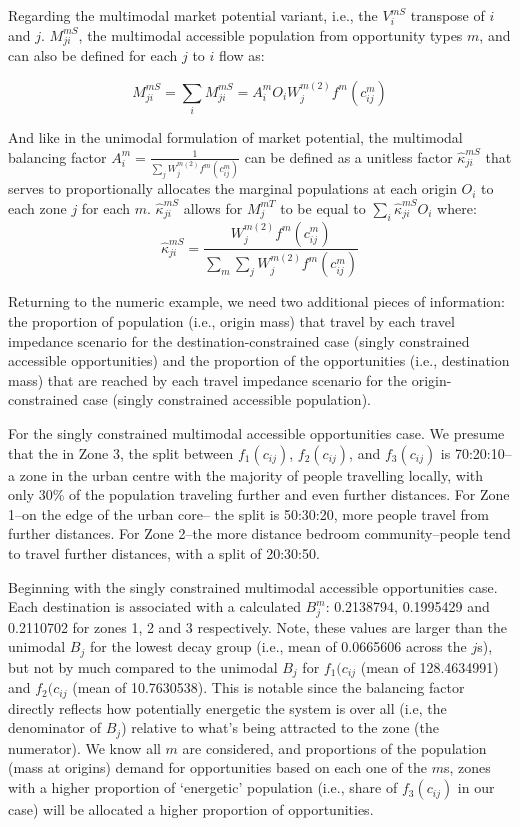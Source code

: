 \documentclass[
11pt, %
oneside, %
english, %
singlespacing, %
]{macthesis} %
\begin{document}
Regarding the multimodal market potential variant, i.e., the \(V_i^{mS}\) transpose of \(i\) and \(j\). \(M^{mS}_{ji}\), the multimodal accessible population from opportunity types \(m\), and can also be defined for each \(j\) to \(i\) flow as:

\begin{equation}
\label{eq:singly-constrained-multimodal-market}
M^{mS}_{ji} = \sum_i M^{mS}_{ji} = A_i^{m} O_i W_j^{m(2)} f^m(c^m_{ij})
\end{equation} 

And like in the unimodal formulation of market potential, the multimodal balancing factor \(A_i^{m} = \frac{1}{\sum_j W_j^{m(2)} f^m(c^m_{ij})}\) can be defined as a unitless factor \(\hat \kappa^{mS}_{ji}\) that serves to proportionally allocates the marginal populations at each origin \(O_i\) to each zone \(j\) for each \(m\). \(\hat \kappa^{mS}_{ji}\) allows for \(M^{mT}_j\) to be equal to \(\sum_i \hat \kappa_{ji}^{mS} O_i\) where:
\[
\hat \kappa_{ji}^{mS} = \frac{W_j^{m(2)} f^m(c^m_{ij})}{\sum_m\sum_j W_j^{m(2)} f^m(c^m_{ij})}
\]

Returning to the numeric example, we need two additional pieces of information: the proportion of population (i.e., origin mass) that travel by each travel impedance scenario for the destination-constrained case (singly constrained accessible opportunities) and the proportion of the opportunities (i.e., destination mass) that are reached by each travel impedance scenario for the origin-constrained case (singly constrained accessible population).

For the singly constrained multimodal accessible opportunities case. We presume that the in Zone 3, the split between \(f_1(c_{ij})\), \(f_2(c_{ij})\), and \(f_3(c_{ij})\) is 70:20:10--a zone in the urban centre with the majority of people travelling locally, with only 30\% of the population traveling further and even further distances. For Zone 1--on the edge of the urban core-- the split is 50:30:20, more people travel from further distances. For Zone 2--the more distance bedroom community--people tend to travel further distances, with a split of 20:30:50.

Beginning with the singly constrained multimodal accessible opportunities case. Each destination is associated with a calculated \(B_j^m\): 0.2138794, 0.1995429 and 0.2110702 for zones 1, 2 and 3 respectively. Note, these values are larger than the unimodal \(B_j\) for the lowest decay group (i.e., mean of 0.0665606 across the \(j\)s), but not by much compared to the unimodal \(B_j\) for \(f_1(c_{ij}\) (mean of 128.4634991) and \(f_2(c_{ij}\) (mean of 10.7630538). This is notable since the balancing factor directly reflects how potentially energetic the system is over all (i.e, the denominator of \(B_j\)) relative to what's being attracted to the zone (the numerator). We know all \(m\) are considered, and proportions of the population (mass at origins) demand for opportunities based on each one of the \(m\)s, zones with a higher proportion of `energetic' population (i.e., share of \(f_3(c_{ij})\) in our case) will be allocated a higher proportion of opportunities.
\end{document}
